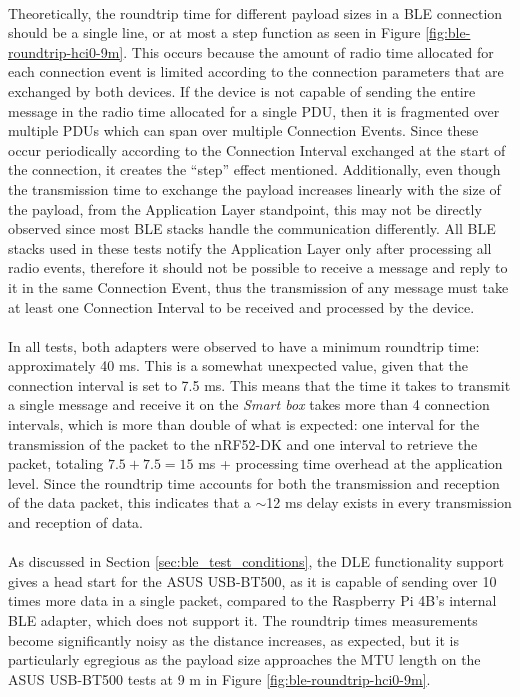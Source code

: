 \paragraph{} Theoretically, the roundtrip time for different payload sizes in a \acs{BLE} connection should be a single line, or at most a step function as seen in Figure \ref{fig:ble-roundtrip-hci0-9m}. This occurs because the amount of radio time allocated for each connection event is limited according to the connection parameters that are exchanged by both devices. If the device is not capable of sending the entire message in the radio time allocated for a single \acs{PDU}, then it is fragmented over multiple \acs{PDU}s which can span over multiple Connection Events. Since these occur periodically according to the Connection Interval exchanged at the start of the connection, it creates the ``step'' effect mentioned. Additionally, even though the transmission time to exchange the payload increases linearly with the size of the payload, from the Application Layer standpoint, this may not be directly observed since most \acs{BLE} stacks handle the communication differently. All \acs{BLE} stacks used in these tests notify the Application Layer only after processing all radio events, therefore it should not be possible to receive a message and reply to it in the same Connection Event, thus the transmission of any message must take at least one Connection Interval to be received and processed by the device.

\paragraph{} In all tests, both adapters were observed to have a minimum roundtrip time: approximately 40 ms. This is a somewhat unexpected value, given that the connection interval is set to 7.5 ms. This means that the time it takes to transmit a single message and receive it on the \textit{Smart box} takes more than 4 connection intervals, which is more than double of what is expected: one interval for the transmission of the packet to the nRF52-DK and one interval to retrieve the packet, totaling $7.5+7.5=15$ ms + processing time overhead at the application level. Since the roundtrip time accounts for both the transmission and reception of the data packet, this indicates that a ${\sim} $12 ms delay exists in every transmission and reception of data.

\paragraph{} As discussed in Section \ref{sec:ble_test_conditions}, the \acs{DLE} functionality support gives a head start for the ASUS USB-BT500, as it is capable of sending over 10 times more data in a single packet, compared to the Raspberry Pi 4B's internal \acs{BLE} adapter, which does not support it. The roundtrip times measurements become significantly noisy as the distance increases, as expected, but it is particularly egregious as the payload size approaches the \acs{MTU} length on the ASUS USB-BT500 tests at 9 m in Figure \ref{fig:ble-roundtrip-hci0-9m}.

